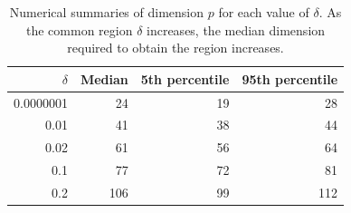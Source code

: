 \begin{table}[htbp]
\begin{center}
\caption{Numerical summaries of dimension $p$ for each value of $\delta$. As the common region $\delta$ increases, the median dimension required to obtain the region increases.}
\begin{tabular}{rrrr}
  \hline
  \hline
  $\delta$ & Median & 5th percentile & 95th percentile \\
  \hline
  0.0000001 & 24 & 19 & 28 \\
      0.01 & 41 & 38 & 44\\
   0.02 & 61 & 56 & 64 \\
     0.1 & 77 & 72 & 81\\   
     0.2 & 106 & 99 & 112\\ 
      \hline
\end{tabular}
\label{tab:dimen}
\end{center}
\end{table}



